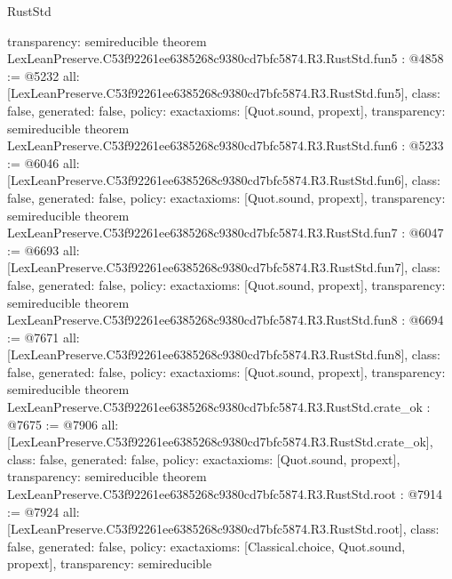 \begin{lexlean}{RustStd}
\begin{coremodule}
{  transparency: semireducible
}
theorem LexLeanPreserve.C53f92261ee6385268c9380cd7bfc5874.R3.RustStd.fun5 : @4858 := @5232 {
  all: [LexLeanPreserve.C53f92261ee6385268c9380cd7bfc5874.R3.RustStd.fun5],
  class: false,
  generated: false,
  policy: exact{axioms: [Quot.sound, propext]},
  transparency: semireducible
}
theorem LexLeanPreserve.C53f92261ee6385268c9380cd7bfc5874.R3.RustStd.fun6 : @5233 := @6046 {
  all: [LexLeanPreserve.C53f92261ee6385268c9380cd7bfc5874.R3.RustStd.fun6],
  class: false,
  generated: false,
  policy: exact{axioms: [Quot.sound, propext]},
  transparency: semireducible
}
theorem LexLeanPreserve.C53f92261ee6385268c9380cd7bfc5874.R3.RustStd.fun7 : @6047 := @6693 {
  all: [LexLeanPreserve.C53f92261ee6385268c9380cd7bfc5874.R3.RustStd.fun7],
  class: false,
  generated: false,
  policy: exact{axioms: [Quot.sound, propext]},
  transparency: semireducible
}
theorem LexLeanPreserve.C53f92261ee6385268c9380cd7bfc5874.R3.RustStd.fun8 : @6694 := @7671 {
  all: [LexLeanPreserve.C53f92261ee6385268c9380cd7bfc5874.R3.RustStd.fun8],
  class: false,
  generated: false,
  policy: exact{axioms: [Quot.sound, propext]},
  transparency: semireducible
}
theorem LexLeanPreserve.C53f92261ee6385268c9380cd7bfc5874.R3.RustStd.crate_ok : @7675 := @7906 {
  all: [LexLeanPreserve.C53f92261ee6385268c9380cd7bfc5874.R3.RustStd.crate_ok],
  class: false,
  generated: false,
  policy: exact{axioms: [Quot.sound, propext]},
  transparency: semireducible
}
theorem LexLeanPreserve.C53f92261ee6385268c9380cd7bfc5874.R3.RustStd.root : @7914 := @7924 {
  all: [LexLeanPreserve.C53f92261ee6385268c9380cd7bfc5874.R3.RustStd.root],
  class: false,
  generated: false,
  policy: exact{axioms: [Classical.choice, Quot.sound, propext]},
  transparency: semireducible
}


\end{coremodule}
\end{lexlean}

